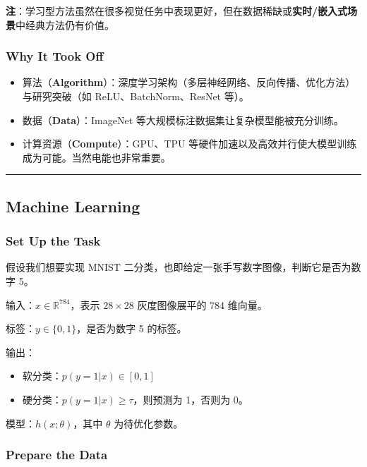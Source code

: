 \textbf{注}：学习型方法虽然在很多视觉任务中表现更好，但在数据稀缺或\textbf{实时/嵌入式场景}中经典方法仍有价值。

\subsubsection{Why It Took Off}\label{why-it-took-off}

\begin{itemize}
  \tightlist
  \item
        算法（\textbf{Algorithm}）：深度学习架构（多层神经网络、反向传播、优化方法）与研究突破（如
        ReLU、BatchNorm、ResNet 等）。
  \item
        数据（\textbf{Data}）：ImageNet
        等大规模标注数据集让复杂模型能被充分训练。
  \item
        计算资源（\textbf{Compute}）：GPU、TPU
        等硬件加速以及高效并行使大模型训练成为可能。当然电能也非常重要。
\end{itemize}

\begin{center}\rule{0.5\linewidth}{0.5pt}\end{center}

\subsection{Machine Learning}\label{machine-learning}

\subsubsection{Set Up the Task}\label{set-up-the-task}

假设我们想要实现 MNIST
二分类，也即给定一张手写数字图像，判断它是否为数字 5。

输入：\(x \in \mathbb{R}^{784}\)，表示 \(28 \times 28\) 灰度图像展平的
\(784\) 维向量。

标签：\(y \in \{0,1\}\)，是否为数字 5 的标签。

输出：

\begin{itemize}
  \tightlist
  \item
        软分类：\(p(y = 1 | x) \in [0, 1]\)
  \item
        硬分类：\(p(y=1|x) \ge \tau\)，则预测为 1，否则为 0。
\end{itemize}

模型：\(h(x; \theta)\)，其中 \(\theta\) 为待优化参数。

\subsubsection{Prepare the Data}\label{prepare-the-data}

